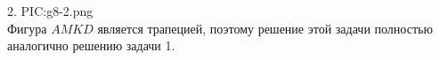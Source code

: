 2. {{PIC:g8-2.png}}\\
Фигура $AMKD$ является трапецией, поэтому решение этой задачи полностью аналогично решению задачи 1.\\
